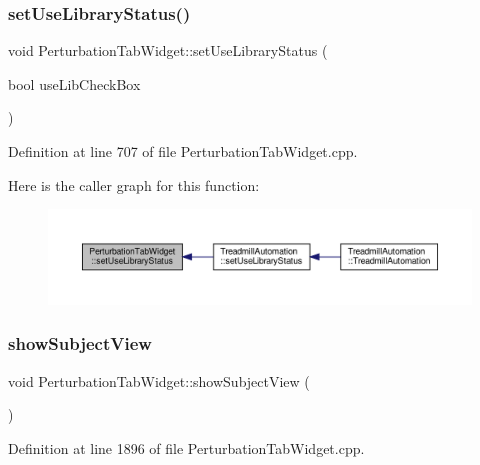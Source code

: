 \subsubsection{\texorpdfstring{set\+Use\+Library\+Status()}{setUseLibraryStatus()}}
{\footnotesize\ttfamily void Perturbation\+Tab\+Widget\+::set\+Use\+Library\+Status (\begin{DoxyParamCaption}\item[{bool}]{use\+Lib\+Check\+Box }\end{DoxyParamCaption})}



Definition at line 707 of file Perturbation\+Tab\+Widget.\+cpp.

Here is the caller graph for this function\+:
\nopagebreak
\begin{figure}[H]
\begin{center}
\leavevmode
\includegraphics[width=350pt]{class_perturbation_tab_widget_af54ddc95a7f3738b9083ff9ca5934d22_icgraph}
\end{center}
\end{figure}
\mbox{\label{class_perturbation_tab_widget_a7cfe137c13f1e9c2e98cbd7580c671ec}} 
\subsubsection{\texorpdfstring{show\+Subject\+View}{showSubjectView}}
{\footnotesize\ttfamily void Perturbation\+Tab\+Widget\+::show\+Subject\+View (\begin{DoxyParamCaption}{ }\end{DoxyParamCaption})\hspace{0.3cm}{\ttfamily [slot]}}



Definition at line 1896 of file Perturbation\+Tab\+Widget.\+cpp.

\mbox{\label{class_perturbation_tab_widget_a2b0878675fa56a11049173a0a8230cfe}} 
